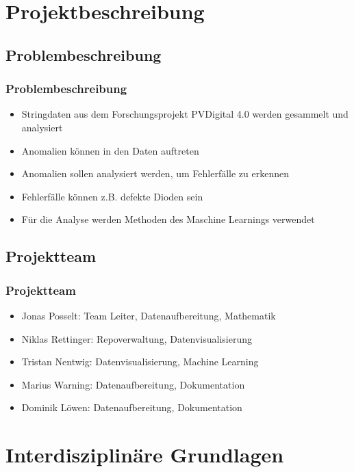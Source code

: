 \documentclass[utf8x, xcolor=dvipsnames]{beamer}
\begin{document}
\section[Projekt]{Projektbeschreibung}
\subsection{Problembeschreibung}

\begin{frame}
\frametitle{Problembeschreibung}
\begin{itemize}
	\item Stringdaten aus dem Forschungsprojekt PVDigital 4.0 werden gesammelt und analysiert
	\item Anomalien können in den Daten auftreten
	\item Anomalien sollen analysiert werden, um Fehlerfälle zu erkennen
	\item Fehlerfälle können z.B. defekte Dioden sein
	\item Für die Analyse werden Methoden des Maschine Learnings verwendet
\end{itemize}
\end{frame}

\subsection{Projektteam}

\begin{frame}
\frametitle{Projektteam}
\begin{itemize}
	\item Jonas Posselt: Team Leiter, Datenaufbereitung, Mathematik
	\item Niklas Rettinger: Repoverwaltung, Datenvisualisierung
	\item Tristan Nentwig: Datenvisualisierung, Machine Learning
	\item Marius Warning: Datenaufbereitung, Dokumentation
	\item Dominik Löwen: Datenaufbereitung, Dokumentation
\end{itemize}
\end{frame}

\section[Grundlagen]{Interdisziplinäre Grundlagen}
\end{document}
